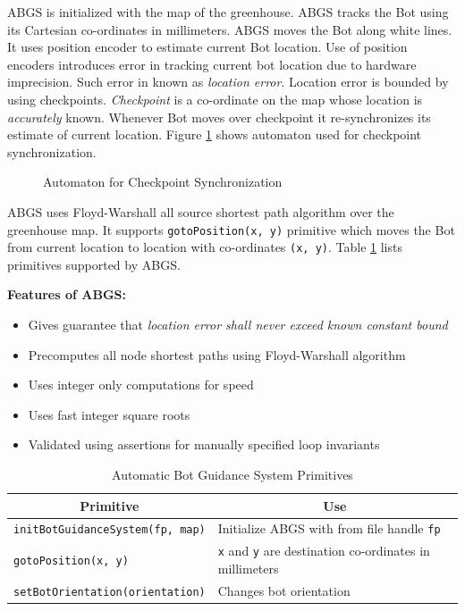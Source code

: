 \documentclass[a4paper, 12pt]{article}
\begin{document}
ABGS is initialized with the map of the greenhouse. ABGS tracks the Bot using its Cartesian co-ordinates in millimeters.
ABGS moves the Bot along white lines. It uses position encoder to estimate current Bot location. Use of position
encoders introduces error in tracking current bot location due to hardware imprecision. Such error in known as 
\emph{location error}. Location error is bounded by using checkpoints. \emph{Checkpoint} is a co-ordinate on 
the map whose location is \emph{accurately} known. Whenever Bot moves over checkpoint it re-synchronizes its
estimate of current location. Figure \ref{fig-automata} shows automaton used for checkpoint synchronization.
\begin{figure}
 
 \caption{Automaton for Checkpoint Synchronization}
 \label{fig-automata}
\end{figure}


ABGS uses Floyd-Warshall all source shortest path algorithm over the greenhouse map. It supports 
\texttt{gotoPosition(x, y)} primitive which moves the Bot from current location to location with co-ordinates
\texttt{(x, y)}. Table \ref{table-abgs-primitives} lists primitives supported by ABGS.

\textbf{Features of ABGS:}
\begin{itemize}
 \item Gives guarantee that \emph{location error shall never exceed known constant bound}
 \item Precomputes all node shortest paths using Floyd-Warshall algorithm
 \item Uses integer only computations for speed
 \item Uses fast integer square roots
 \item Validated using assertions for manually specified loop invariants
\end{itemize}

\begin{table}
 \centering
 \begin{tabular}{|l|l|}
 \hline
 \multicolumn{1}{|c|}{\textbf{Primitive}} & \multicolumn{1}{|c|}{\textbf{Use}}\\
 \hline \hline
 \texttt{initBotGuidanceSystem(fp, map)} & Initialize ABGS with from file handle \texttt{fp}\\
 \texttt{gotoPosition(x, y)} & \texttt{x} and \texttt{y} are destination co-ordinates in millimeters\\
 \texttt{setBotOrientation(orientation)} & Changes bot orientation\\
 \hline
 \end{tabular}
 \caption{Automatic Bot Guidance System Primitives}
 \label{table-abgs-primitives}
\end{table}
\end{document}
